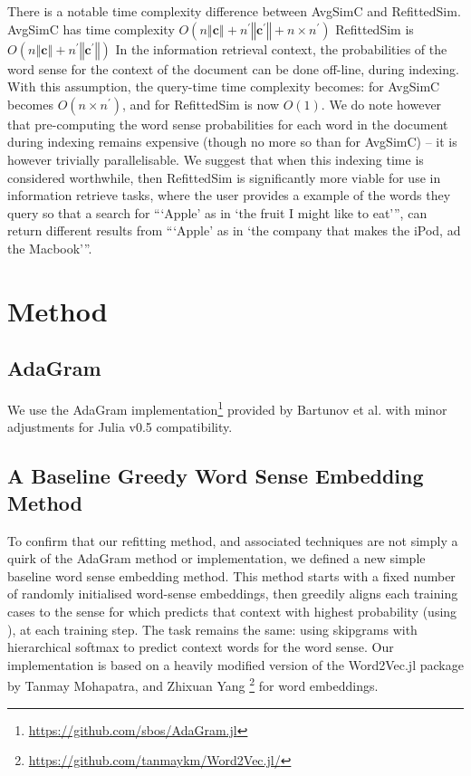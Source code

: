 \documentclass{sig-alternate}
\renewcommand{\c}{\mathbf{c}}
\begin{document}
There is a notable time complexity difference between AvgSimC and RefittedSim.
AvgSimC has time complexity $O(n\left\Vert \c\right\Vert +n^{\prime}\left\Vert \c^{\prime}\right\Vert +n\times n^{\prime})$
RefittedSim is $O(n\left\Vert \c\right\Vert +n^{\prime}\left\Vert \c^{\prime}\right\Vert)$
In the information retrieval context, the probabilities of the word sense for the context of the document can be done off-line, during indexing. With this assumption, the query-time time complexity becomes: for AvgSimC becomes $O(n\times n^{\prime})$, and for RefittedSim is now $O(1)$. We do note however that pre-computing the word sense probabilities for each word in the document during indexing remains expensive (though no more so than for AvgSimC) -- it is however trivially parallelisable. We suggest that when this indexing time is considered worthwhile, then RefittedSim is significantly more viable for use in information retrieve tasks, where the user provides a example of the words they query so that a search for \enquote{\enquote{Apple} as in \enquote{the fruit I might like to eat}}, can return different results from \enquote{\enquote{Apple} as in \enquote{the company that makes the iPod, ad the Macbook}}.




\section{Method}

\subsection{AdaGram}


We use the AdaGram \parencite{AdaGrams} implementation\footnote{\url{https://github.com/sbos/AdaGram.jl}} provided by Bartunov et al. with minor adjustments for Julia v0.5 compatibility.

\subsection{A Baseline Greedy Word Sense Embedding Method}

To confirm that our refitting method, and associated techniques are not simply a quirk of the AdaGram method or implementation, we defined a new simple baseline word sense embedding method.
This method starts with a fixed number of randomly initialised word-sense embeddings, then greedily aligns each training cases to the sense for which predicts that context with highest probability (using ), at each training step. The task remains the same: using skipgrams with hierarchical softmax to predict context words for the word sense.
Our implementation is based on a heavily modified version of the Word2Vec.jl package by Tanmay Mohapatra, and Zhixuan Yang \footnote{\url{https://github.com/tanmaykm/Word2Vec.jl/}} for word embeddings.
\end{document}
